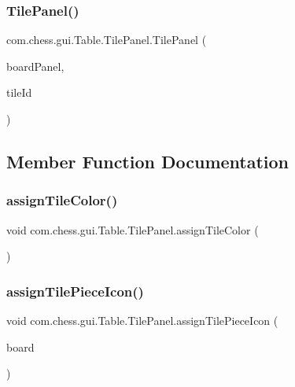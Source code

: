 \subsubsection{\texorpdfstring{TilePanel()}{TilePanel()}}
{\footnotesize\ttfamily com.\+chess.\+gui.\+Table.\+Tile\+Panel.\+Tile\+Panel (\begin{DoxyParamCaption}\item[{final \mbox{\hyperlink{classcom_1_1chess_1_1gui_1_1_table_1_1_board_panel}{Board\+Panel}}}]{board\+Panel,  }\item[{final int}]{tile\+Id }\end{DoxyParamCaption})\hspace{0.3cm}{\ttfamily [package]}}



\subsection{Member Function Documentation}
\mbox{\label{classcom_1_1chess_1_1gui_1_1_table_1_1_tile_panel_a443bd1bd2601f8609cedd9c0d10dd0c8}} 
\subsubsection{\texorpdfstring{assignTileColor()}{assignTileColor()}}
{\footnotesize\ttfamily void com.\+chess.\+gui.\+Table.\+Tile\+Panel.\+assign\+Tile\+Color (\begin{DoxyParamCaption}{ }\end{DoxyParamCaption})\hspace{0.3cm}{\ttfamily [private]}}

\mbox{\label{classcom_1_1chess_1_1gui_1_1_table_1_1_tile_panel_a654736911aa6bc9af91ba9c80487da74}} 
\subsubsection{\texorpdfstring{assignTilePieceIcon()}{assignTilePieceIcon()}}
{\footnotesize\ttfamily void com.\+chess.\+gui.\+Table.\+Tile\+Panel.\+assign\+Tile\+Piece\+Icon (\begin{DoxyParamCaption}\item[{final \mbox{\hyperlink{classcom_1_1chess_1_1engine_1_1classic_1_1board_1_1_board}{Board}}}]{board }\end{DoxyParamCaption})\hspace{0.3cm}{\ttfamily [private]}}

